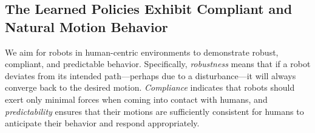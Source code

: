 \subsection{The Learned Policies Exhibit Compliant and Natural Motion Behavior}

We aim for robots in human-centric environments to demonstrate robust, compliant, and predictable behavior. Specifically, \emph{robustness} means that if a robot deviates from its intended path—perhaps due to a disturbance—it will always converge back to the desired motion. \emph{Compliance} indicates that robots should exert only minimal forces when coming into contact with humans, and \emph{predictability} ensures that their motions are sufficiently consistent for humans to anticipate their behavior and respond appropriately.

